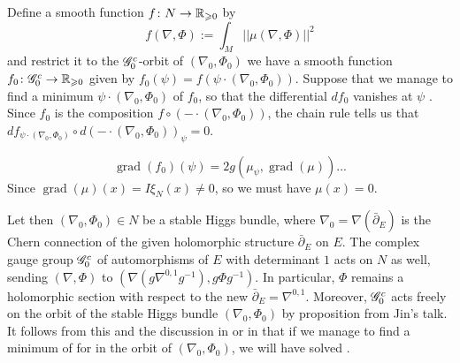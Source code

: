 \documentclass[A4paper, 12pt, british, reqno]{amsart}
\DeclareMathOperator{\grad}{grad}
\newcommand{\1}{\mathbbm{1}}
\begin{document}
Define a smooth function $f\colon N\to \mathbb{R}_{\geqslant 0}$ by
\[ f(\nabla,\Phi):=\int_{M}||\mu(\nabla,\Phi)||^{2} \]
and restrict it to the $\mathscr{G}^{c}_{0}$-orbit of $(\nabla_{0},\Phi_{0})$ we have a smooth function $f_{0}\colon \mathscr{G}^{c}_{0}\to \mathbb{R}_{\geqslant 0}$ given by $f_{0}(\psi)=f(\psi\cdot (\nabla_{0},\Phi_{0}))$.
Suppose that we manage to find a minimum $\psi\cdot (\nabla_{0},\Phi_{0})$ of $f_{0}$, so that the differential $df_{0}$ vanishes at $\psi$ \cite[Exercise 11.24]{lee13}.
Since $f_{0}$ is the composition $f\circ (-\cdot (\nabla_{0},\Phi_{0}))$, the chain rule tells us that $df_{\psi\cdot (\nabla_{0},\Phi_{0})}\circ d(-\cdot (\nabla_{0},\Phi_{0}))_{\psi}=0$.

\[ \grad(f_{0})(\psi)=2g(\mu_{\psi},\grad(\mu))... \]
Since $\grad(\mu)(x)=I\xi_{N}(x)\neq 0$, so we must have $\mu(x)=0$.

Let then $(\nabla_{0},\Phi_{0})\in N$ be a stable Higgs bundle, where $\nabla_{0}=\nabla(\bar{\partial}_{E})$ is the Chern connection of the given holomorphic structure $\bar{\partial}_{E}$ on $E$.
The complex gauge group $\mathscr{G}^{c}_{0}$ of automorphisms of $E$ with determinant $1$ acts on $N$ as well, sending $(\nabla,\Phi)$ to $(\nabla(g\nabla^{0,1}g^{-1}),g\Phi g^{-1})$.
In particular, $\Phi$ remains a holomorphic section with respect to the new $\bar{\partial}_{E}=\nabla^{0,1}$.
Moreover, $\mathscr{G}^{c}_{0}$ acts freely on the orbit of the stable Higgs bundle $(\nabla_{0},\Phi_{0})$ by proposition \cite[(3.15)]{hit87a} from Jin's talk.
It follows from this and the discussion in \cite[\S 4]{hit87a} or in \cite[\S 8]{ab83} that if we manage to find a minimum of for
in the orbit of $(\nabla_{0},\Phi_{0})$, we will have solved .
\end{document}
